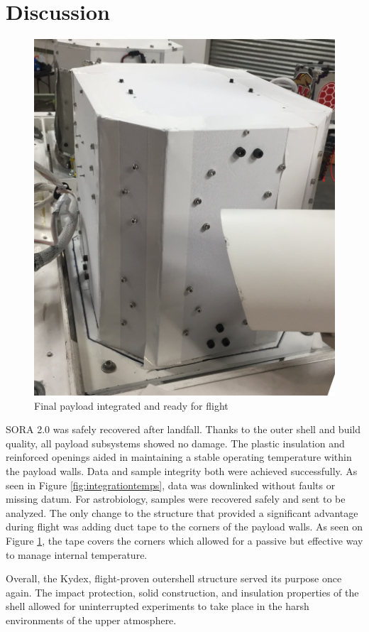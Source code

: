 \section{Discussion}
\label{sec:Discussion}
\begin{figure}[H]
	\begin{center}
		\includegraphics[width=70 mm, scale=1]{figures/payload_integrated.JPG}
		\caption{Final payload integrated and ready for flight}
		\label{fig:payload_int}
	\end{center}
\end{figure}

SORA 2.0 was safely recovered after landfall.  Thanks to the outer shell and build quality, all payload subsystems showed no damage.  
The plastic insulation and reinforced openings aided in maintaining a stable operating temperature within the payload walls.  
Data and sample integrity both were achieved successfully.  As seen in Figure \ref{fig:integrationtemps}, data was downlinked without faults or 
missing datum. For astrobiology, samples were recovered safely and sent to be analyzed. The only change to the structure that provided 
a significant advantage during flight was adding duct tape to the corners of the payload walls. 
As seen on Figure \ref{fig:payload_int}, the tape covers the corners which allowed for a passive but effective way to manage internal 
temperature.  

Overall, the Kydex, flight-proven outershell structure served its purpose once again.  
The impact protection, solid construction, and insulation properties of the shell allowed for uninterrupted experiments to 
take place in the harsh environments of the upper atmosphere.